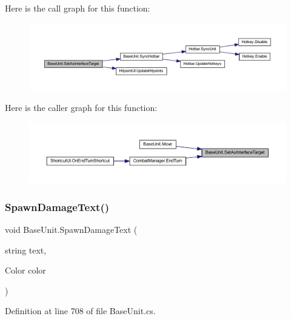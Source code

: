 Here is the call graph for this function\+:
\nopagebreak
\begin{figure}[H]
\begin{center}
\leavevmode
\includegraphics[width=350pt]{class_base_unit_abae0a52156648495ea6e8487782f8636_cgraph}
\end{center}
\end{figure}
Here is the caller graph for this function\+:
\nopagebreak
\begin{figure}[H]
\begin{center}
\leavevmode
\includegraphics[width=350pt]{class_base_unit_abae0a52156648495ea6e8487782f8636_icgraph}
\end{center}
\end{figure}
\mbox{\label{class_base_unit_aacee7b4acfdd28621f3a1b66bf8d646a}} 
\subsubsection{\texorpdfstring{SpawnDamageText()}{SpawnDamageText()}}
{\footnotesize\ttfamily void Base\+Unit.\+Spawn\+Damage\+Text (\begin{DoxyParamCaption}\item[{string}]{text,  }\item[{Color}]{color }\end{DoxyParamCaption})}



Definition at line 708 of file Base\+Unit.\+cs.

